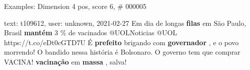 \begin{frame}{Examples: Dimension 4 pos, score 6, \# 000005}
\footnotesize
\begin{exampleblock}{text: t109612, user: unknown, 2021-02-27}
Em dia de longas \textbf{filas} em São Paulo, Brasil \textbf{mantém} 3 \% de 
vacinados @UOLNoticias @UOL https://t.co/eDt0cGTD7U É \textbf{prefeito} 
brigando com \textbf{governador} , e o povo morrendo! O bandido nessa história 
é Bolsonaro. O governo tem que comprar VACINA! \textbf{vacinação} em 
\textbf{massa} , salva! 
\end{exampleblock}
\end{frame}
